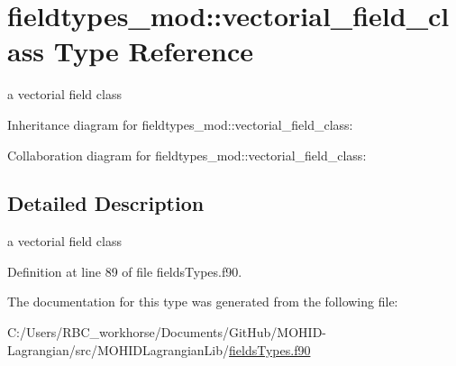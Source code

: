\hypertarget{structfieldtypes__mod_1_1vectorial__field__class}{}\section{fieldtypes\+\_\+mod\+:\+:vectorial\+\_\+field\+\_\+class Type Reference}
\label{structfieldtypes__mod_1_1vectorial__field__class}


a vectorial field class  




Inheritance diagram for fieldtypes\+\_\+mod\+:\+:vectorial\+\_\+field\+\_\+class\+:


Collaboration diagram for fieldtypes\+\_\+mod\+:\+:vectorial\+\_\+field\+\_\+class\+:


\subsection{Detailed Description}
a vectorial field class 

Definition at line 89 of file fields\+Types.\+f90.



The documentation for this type was generated from the following file\+:\begin{DoxyCompactItemize}
\item 
C\+:/\+Users/\+R\+B\+C\+\_\+workhorse/\+Documents/\+Git\+Hub/\+M\+O\+H\+I\+D-\/\+Lagrangian/src/\+M\+O\+H\+I\+D\+Lagrangian\+Lib/\mbox{\hyperlink{fields_types_8f90}{fields\+Types.\+f90}}\end{DoxyCompactItemize}
